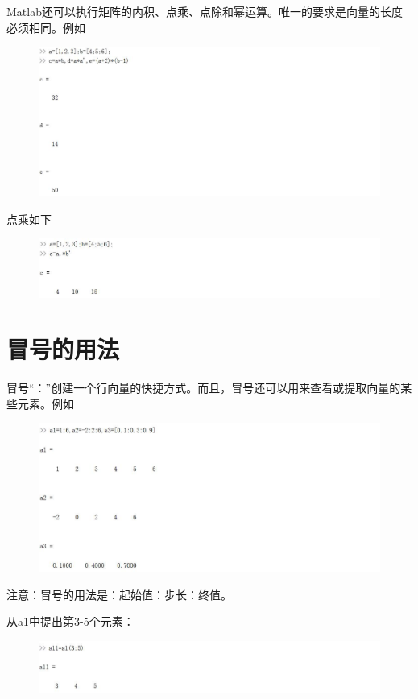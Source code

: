 \documentclass[cn,10pt,math=newtx,citestyle=gb7714-2015,bibstyle=gb7714-2015]{elegantbook}
\begin{document}
{{\begin{figure}[htbp!]
	\end{figure}
	
	Matlab还可以执行矩阵的内积、点乘、点除和幂运算。唯一的要求是向量的长度必须相同。例如
	\begin{figure}[htbp!]
		\centering
		\includegraphics[width=0.8\linewidth]{FIG/innerprod.jpg}
		
	\end{figure}
	
	点乘如下
	\begin{figure}[htbp!]
		\centering
		\includegraphics[width=0.8\linewidth]{FIG/dotprod.jpg}
		\centering
	\end{figure}
	
	\section{冒号的用法}
	
	冒号“：”创建一个行向量的快捷方式。而且，冒号还可以用来查看或提取向量的某些元素。例如
	\begin{figure}[htbp!]
		\centering
		\includegraphics[width=0.8\linewidth]{FIG/colon.jpg}
		\centering
	\end{figure}
	
	注意：冒号的用法是：起始值：步长：终值。
	
	从a1中提出第3-5个元素：
	\begin{figure}[htbp!]
		\centering
		\includegraphics[width=0.8\linewidth]{FIG/extracting1.jpg}
		\centering
	\end{figure}
	
}}
\end{document}
